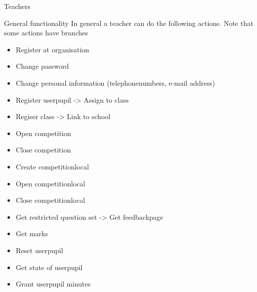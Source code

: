 \begin{section}{Teachers}
\begin{subsection}{General functionality}
	In general a teacher can do the following actions. Note that some actions have branches
	\begin{itemize}
		\item Register at organisation
		\item Change password
		\item Change personal information (telephonenumbers, e-mail address)
		\item Register userpupil -> Assign to class
		\item Regiser class -> Link to school
		\item Open competition
		\item Close competition
		\item Create competitionlocal
		\item Open competitionlocal
		\item Close competitionlocal
		\item Get restricted question set -> Get feedbackpage
		\item Get marks
		\item Reset userpupil
		\item Get state of userpupil
		\item Grant userpupil minutes
	\end{itemize}
    \end{subsection}

\end{section}

